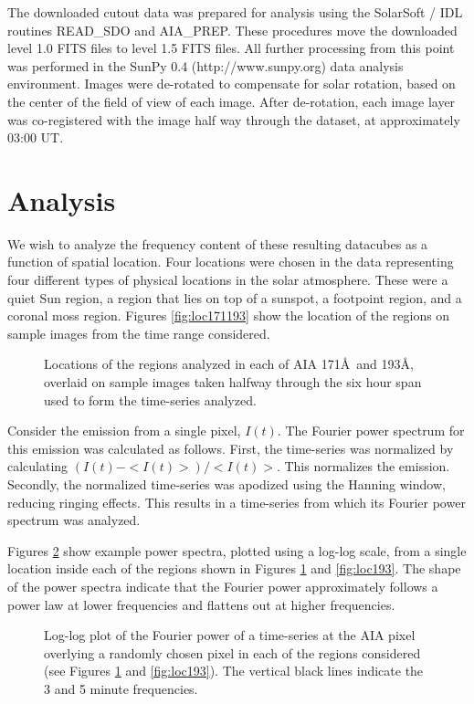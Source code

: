 \documentclass[preprint]{../aastex52/aastex}
\begin{document}
The downloaded cutout data was prepared for analysis using the
SolarSoft / IDL routines READ\_SDO and AIA\_PREP.  These procedures
move the downloaded level 1.0 FITS files to level 1.5 FITS files.  All
further processing from this point was performed in the SunPy 0.4
(http://www.sunpy.org) data analysis environment.  Images were
de-rotated to compensate for solar rotation, based on the center of
the field of view of each image.  After de-rotation, each image layer
was co-registered with the image half way through the dataset, at
approximately 03:00 UT.

\section{Analysis}\label{sec:anal}
We wish to analyze the frequency content of these resulting datacubes
as a function of spatial location.  Four locations were chosen in the
data representing four different types of physical locations in the
solar atmosphere.  These were a quiet Sun region, a region that lies
on top of a sunspot, a footpoint region, and a coronal moss region.
Figures \ref{fig:loc171193} show the location of the regions on sample
images from the time range considered.

\begin{figure}
\label{fig:loc171}
\caption{Locations of the regions analyzed in each of AIA 171\AA\ and
  193\AA, overlaid on sample images taken halfway through the six hour
  span used to form the time-series analyzed.}
\end{figure}

Consider the emission from a single pixel, $I(t)$.  The Fourier power
spectrum for this emission was calculated as follows.  First, the
time-series was normalized by calculating $(I(t) - <I(t)>)/<I(t)>$.
This normalizes the emission.  Secondly, the normalized time-series
was apodized using the Hanning window, reducing ringing effects.  This
results in a time-series from which its Fourier power spectrum was
analyzed. 

Figures \ref{fig:compare171193} show example power spectra, plotted using
a log-log scale, from a single location inside each of the regions
shown in Figures \ref{fig:loc171} and \ref{fig:loc193}.  The shape of
the power spectra indicate that the Fourier power approximately
follows a power law at lower frequencies and flattens out at higher
frequencies.

\begin{figure}
\label{fig:compare171193}
\caption{Log-log plot of the Fourier power of a time-series at the AIA
  pixel overlying a randomly chosen pixel in each of the regions
  considered (see Figures \protect\ref{fig:loc171} and
  \protect\ref{fig:loc193}).  The vertical black lines indicate the 3
  and 5 minute frequencies.}
\end{figure}
\end{document}
